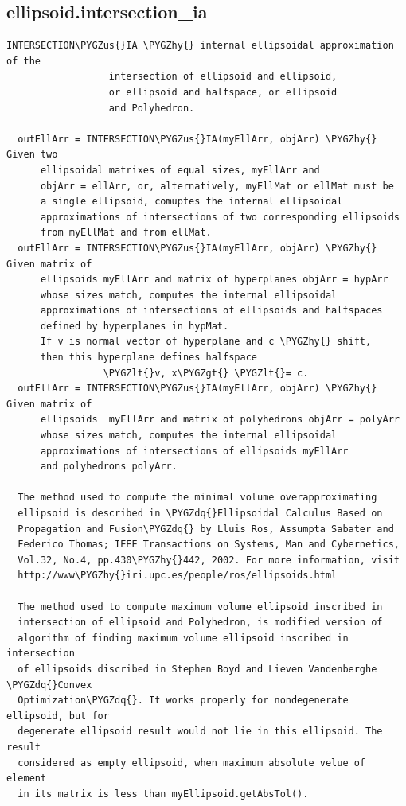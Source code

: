 \documentclass[letterpaper,10pt,english]{sphinxmanual}
\def\PYGZus{\char`\_}
\def\PYGZlt{\char`\<}
\def\PYGZgt{\char`\>}
\def\PYGZhy{\char`\-}
\def\PYGZdq{\char`\"}
\begin{document}
\subsection{ellipsoid.intersection\_ia}
\label{chap_functions:ellipsoid-intersection-ia}
\begin{Verbatim}[commandchars=\\\{\}]
INTERSECTION\PYGZus{}IA \PYGZhy{} internal ellipsoidal approximation of the
                  intersection of ellipsoid and ellipsoid,
                  or ellipsoid and halfspace, or ellipsoid
                  and Polyhedron.

  outEllArr = INTERSECTION\PYGZus{}IA(myEllArr, objArr) \PYGZhy{} Given two
      ellipsoidal matrixes of equal sizes, myEllArr and
      objArr = ellArr, or, alternatively, myEllMat or ellMat must be
      a single ellipsoid, comuptes the internal ellipsoidal
      approximations of intersections of two corresponding ellipsoids
      from myEllMat and from ellMat.
  outEllArr = INTERSECTION\PYGZus{}IA(myEllArr, objArr) \PYGZhy{} Given matrix of
      ellipsoids myEllArr and matrix of hyperplanes objArr = hypArr
      whose sizes match, computes the internal ellipsoidal
      approximations of intersections of ellipsoids and halfspaces
      defined by hyperplanes in hypMat.
      If v is normal vector of hyperplane and c \PYGZhy{} shift,
      then this hyperplane defines halfspace
                 \PYGZlt{}v, x\PYGZgt{} \PYGZlt{}= c.
  outEllArr = INTERSECTION\PYGZus{}IA(myEllArr, objArr) \PYGZhy{} Given matrix of
      ellipsoids  myEllArr and matrix of polyhedrons objArr = polyArr
      whose sizes match, computes the internal ellipsoidal
      approximations of intersections of ellipsoids myEllArr
      and polyhedrons polyArr.

  The method used to compute the minimal volume overapproximating
  ellipsoid is described in \PYGZdq{}Ellipsoidal Calculus Based on
  Propagation and Fusion\PYGZdq{} by Lluis Ros, Assumpta Sabater and
  Federico Thomas; IEEE Transactions on Systems, Man and Cybernetics,
  Vol.32, No.4, pp.430\PYGZhy{}442, 2002. For more information, visit
  http://www\PYGZhy{}iri.upc.es/people/ros/ellipsoids.html

  The method used to compute maximum volume ellipsoid inscribed in
  intersection of ellipsoid and Polyhedron, is modified version of
  algorithm of finding maximum volume ellipsoid inscribed in intersection
  of ellipsoids discribed in Stephen Boyd and Lieven Vandenberghe \PYGZdq{}Convex
  Optimization\PYGZdq{}. It works properly for nondegenerate ellipsoid, but for
  degenerate ellipsoid result would not lie in this ellipsoid. The result
  considered as empty ellipsoid, when maximum absolute velue of element
  in its matrix is less than myEllipsoid.getAbsTol().


\end{Verbatim}
\end{document}
